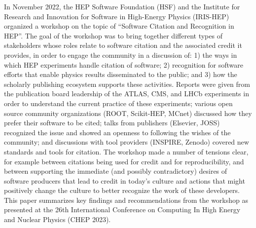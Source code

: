 In November 2022, the HEP Software Foundation (HSF) and the Institute for Research and Innovation for Software in High-Energy Physics (IRIS-HEP) organized a workshop on the topic of ``Software Citation and Recognition in HEP''.
The goal of the workshop was to bring together different types of stakeholders whose roles relate to software citation and the associated credit it provides, in order to engage the community in a discussion of: 1) the ways in which HEP experiments handle citation of software; 2) recognition for software efforts that enable physics results disseminated to the public; and 3) how the scholarly publishing ecosystem supports these activities.
Reports were given from the publication board leadership of the ATLAS, CMS, and LHCb experiments in order to understand the current practice of these experiments; various open source community organizations (ROOT, Scikit-HEP, MCnet) discussed how they prefer their software to be cited; talks from publishers (Elsevier, JOSS) recognized the issue and showed an openness to following the wishes of the community; and discussions with tool providers (INSPIRE, Zenodo) covered new standards and tools for citation.
The workshop made a number of tensions clear, for example between citations being used for credit and for reproducibility, and between supporting the immediate (and possibly contradictory) desires of software producers that lead to credit in today's culture and actions that might positively change the culture to better recognize the work of these developers.
This paper summarizes key findings and recommendations from the workshop as presented at the 26th International Conference on Computing In High Energy and Nuclear Physics (CHEP 2023).

